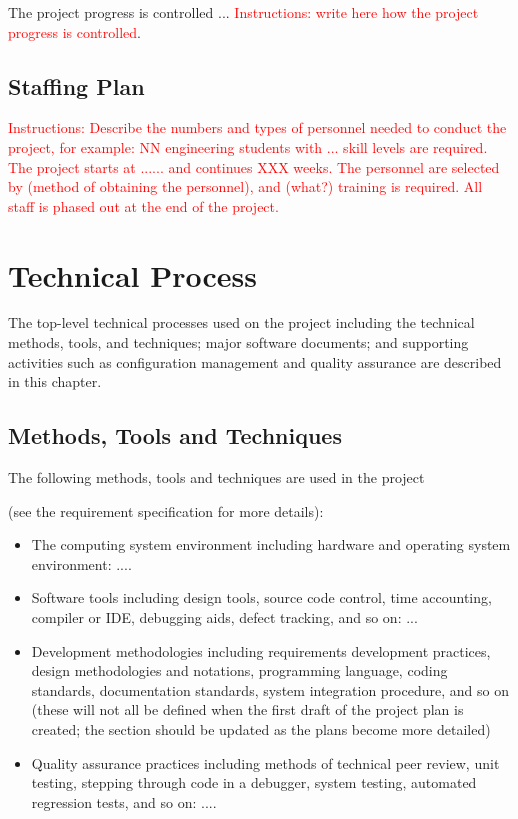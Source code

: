 \documentclass{article}
\begin{document}
\vspace{0.5cm}

The project progress is controlled ... \textcolor{red}{Instructions: write here how the project progress is controlled}.

\subsection{Staffing Plan}

\textcolor{red}{Instructions: Describe the numbers and types of personnel needed to conduct the
project, for example: NN engineering students with ... skill levels are required.
The project starts at ...... and continues XXX weeks. The personnel are selected
by (method of obtaining the personnel), and (what?) training is required. All staff
is phased out at the end of the project.}

\section{Technical Process}
The top-level technical processes used on the project including the technical
methods, tools, and techniques; major software documents; and supporting
activities such as configuration management and quality assurance are described
in this chapter.

\subsection{Methods, Tools and Techniques}
The following methods, tools and techniques are used in the project {\color{red} (see the
requirement specification for more details):


\begin{itemize}
\item The computing system environment including hardware and operating system environment: ....
\item Software tools including design tools, source code control, time accounting, compiler or IDE, debugging aids, defect tracking, and so on: ...
\item Development methodologies including requirements development practices, design methodologies and notations, programming language, coding standards, documentation standards, system integration procedure, and so on (these will not all be defined when the first draft of the project plan is created; the section should be updated as the plans become more detailed)
\item Quality assurance practices including methods of technical peer review, unit testing, stepping through code in a debugger, system testing, automated regression tests, and so on: ....
\end{itemize}
}
\end{document}
